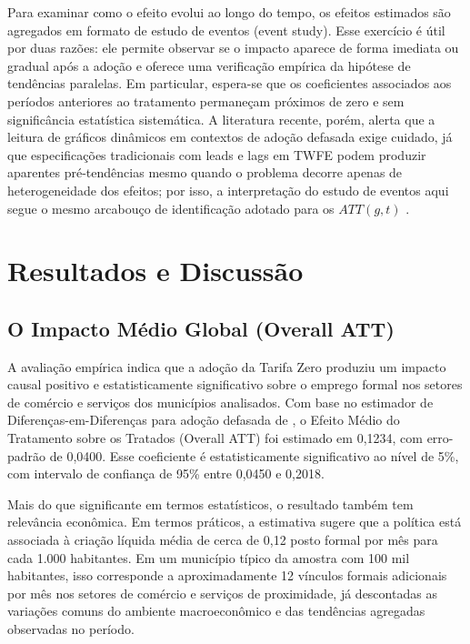 \documentclass[12pt, a4paper]{article}
\begin{document}
Para examinar como o efeito evolui ao longo do tempo, os efeitos estimados são agregados em formato de estudo de eventos (event study).
Esse exercício é útil por duas razões: ele permite observar se o impacto aparece de forma imediata ou gradual após a adoção e oferece uma verificação empírica da hipótese de tendências paralelas.
Em particular, espera-se que os coeficientes associados aos períodos anteriores ao tratamento permaneçam próximos de zero e sem significância estatística sistemática.
A literatura recente, porém, alerta que a leitura de gráficos dinâmicos em contextos de adoção defasada exige cuidado, já que especificações tradicionais com leads e lags em TWFE podem produzir aparentes pré-tendências mesmo quando o problema decorre apenas de heterogeneidade dos efeitos; por isso, a interpretação do estudo de eventos aqui segue o mesmo arcabouço de identificação adotado para os $ATT\left(g,t\right)$ \citep{sunabraham2021, CallawaySantanna2021, marcussantanna2021}.

\section{Resultados e Discussão}
\subsection{O Impacto Médio Global (Overall ATT)}
A avaliação empírica indica que a adoção da Tarifa Zero produziu um impacto causal positivo e estatisticamente significativo sobre o emprego formal nos setores de comércio e serviços dos municípios analisados.
Com base no estimador de Diferenças-em-Diferenças para adoção defasada de \citet{CallawaySantanna2021}, o Efeito Médio do Tratamento sobre os Tratados (Overall ATT) foi estimado em 0,1234, com erro-padrão de 0,0400.
Esse coeficiente é estatisticamente significativo ao nível de 5\%, com intervalo de confiança de 95\% entre 0,0450 e 0,2018.

Mais do que significante em termos estatísticos, o resultado também tem relevância econômica.
Em termos práticos, a estimativa sugere que a política está associada à criação líquida média de cerca de 0,12 posto formal por mês para cada 1.000 habitantes.
Em um município típico da amostra com 100 mil habitantes, isso corresponde a aproximadamente 12 vínculos formais adicionais por mês nos setores de comércio e serviços de proximidade, já descontadas as variações comuns do ambiente macroeconômico e das tendências agregadas observadas no período.
\end{document}
